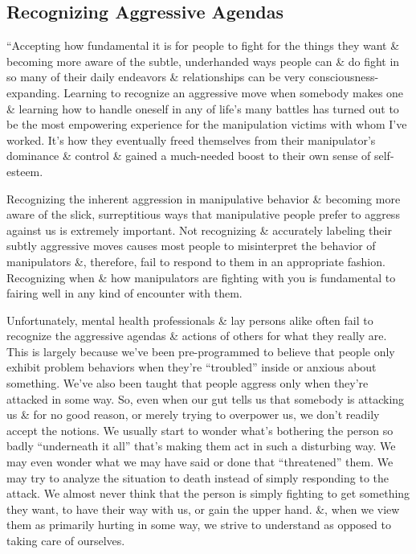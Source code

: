 \documentclass{article}
\numberwithin{equation}{section}
\begin{document}
\begin{enumerate}
\end{enumerate}

\subsection{Recognizing Aggressive Agendas}
``Accepting how fundamental it is for people to fight for the things they want \& becoming more aware of the subtle, underhanded ways people can \& do fight in so many of their daily endeavors \& relationships can be very consciousness-expanding. Learning to recognize an aggressive move when somebody makes one \& learning how to handle oneself in any of life's many battles has turned out to be the most empowering experience for the manipulation victims with whom I've worked. It's how they eventually freed themselves from their manipulator's dominance \& control \& gained a much-needed boost to their own sense of self-esteem.

Recognizing the inherent aggression in manipulative behavior \& becoming more aware of the slick, surreptitious ways that manipulative people prefer to aggress against us is extremely important. Not recognizing \& accurately labeling their subtly aggressive moves causes most people to misinterpret the behavior of manipulators \&, therefore, fail to respond to them in an appropriate fashion. Recognizing when \& how manipulators are fighting with you is fundamental to fairing well in any kind of encounter with them.

Unfortunately, mental health professionals \& lay persons alike often fail to recognize the aggressive agendas \& actions of others for what they really are. This is largely because we've been pre-programmed to believe that people only exhibit problem behaviors when they're ``troubled'' inside or anxious about something. We've also been taught that people aggress only when they're attacked in some way. So, even when our gut tells us that somebody is attacking us \& for no good reason, or merely trying to overpower us, we don't readily accept the notions. We usually start to wonder what's bothering the person so badly ``underneath it all'' that's making them act in such a disturbing way. We may even wonder what we may have said or done that ``threatened'' them. We may try to analyze the situation to death instead of simply responding to the attack. We almost never think that the person is simply fighting to get something they want, to have their way with us, or gain the upper hand. \&, when we view them as primarily hurting in some way, we strive to understand as opposed to taking care of ourselves.
\end{document}
